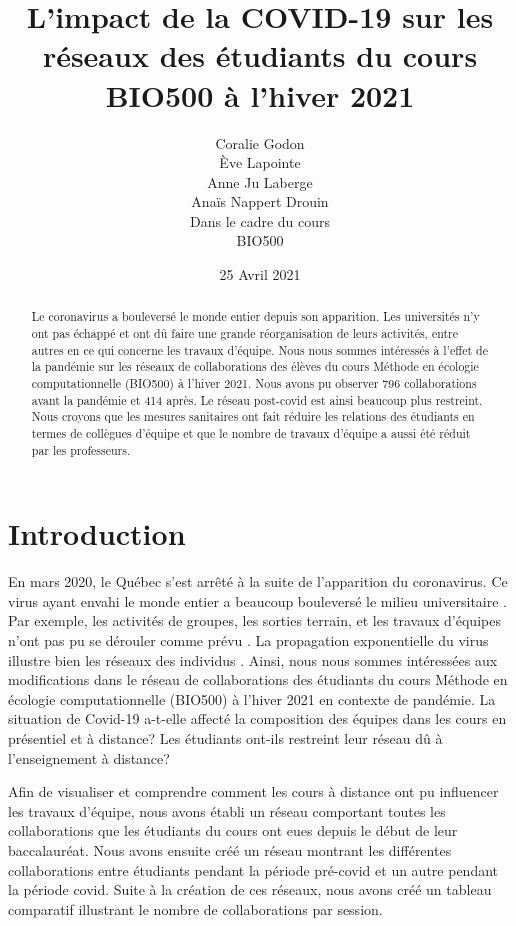 \documentclass[12pt]{article}
\title{\textbf{L’impact de la COVID-19 sur les réseaux des étudiants du cours BIO500 à l’hiver 2021}}
\author{Coralie Godon \\ Ève Lapointe \\ Anne Ju Laberge \\ Anaïs Nappert Drouin \\ \small Dans le cadre du cours \\ BIO500}
\date{\small 25 Avril 2021}
\begin{document}
\maketitle
\begin{abstract}
    Le coronavirus a bouleversé le monde entier depuis son apparition. Les universités n’y ont pas échappé et ont dû faire une grande réorganisation de leurs activités, entre autres en ce qui concerne les travaux d’équipe. Nous nous sommes intéressés à l’effet de la pandémie sur les réseaux de collaborations des élèves du cours Méthode en écologie computationnelle (BIO500) à l’hiver 2021. Nous avons pu observer 796 collaborations avant la pandémie et 414 après. Le réseau post-covid est ainsi beaucoup plus restreint. Nous croyons que les mesures sanitaires ont fait réduire les relations des étudiants en termes de collègues d’équipe et que le nombre de travaux d’équipe a aussi été réduit par les professeurs. 

\end{abstract}
\hspace{4cm}

\section*{\large Introduction\vspace{-0.1cm}}
En mars 2020, le Québec s’est arrêté à la suite de l’apparition du coronavirus. Ce virus ayant envahi le monde entier a beaucoup bouleversé le milieu universitaire \citep{Gouvernement}. Par exemple, les activités de groupes, les sorties terrain, et les travaux d’équipes n’ont pas pu se dérouler comme prévu \citep{UniversiteShebrooke2021}. La propagation exponentielle du virus illustre bien les réseaux des individus \citep{komarova_patterns_nodate}. Ainsi, nous nous sommes intéressées aux modifications dans le réseau de collaborations des étudiants du cours Méthode en écologie computationnelle (BIO500) à l’hiver 2021 en contexte de pandémie. La situation de Covid-19 a-t-elle affecté la composition des équipes dans les cours en présentiel et à distance? Les étudiants ont-ils restreint leur réseau dû à l’enseignement à distance?
\par Afin de visualiser et comprendre comment les cours à distance ont pu influencer les travaux d’équipe, nous avons établi un réseau comportant toutes les collaborations que les étudiants du cours ont eues depuis le début de leur baccalauréat. Nous avons ensuite créé un réseau montrant les différentes collaborations entre étudiants pendant la période pré-covid et un autre pendant la période covid. Suite à la création de ces réseaux, nous avons créé un tableau comparatif illustrant le nombre de collaborations par session.
\end{document}
